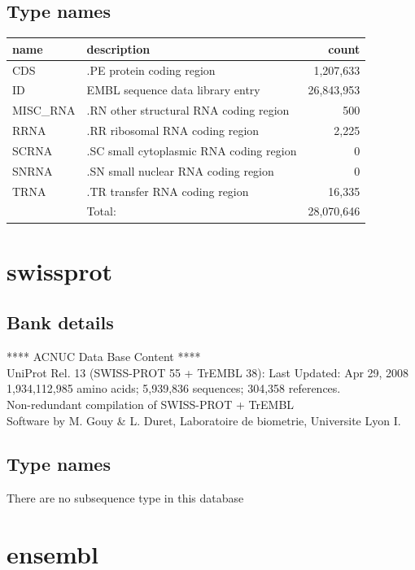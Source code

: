 \documentclass{article}
\begin{document}
\begin{Schunk}
\subsection{Type names}
\noindent\begin{tabular}{llr}
\hline \hline
name & description & count \\
\hline
CDS  &  .PE protein coding region  &  1,207,633 \\
ID  &  EMBL sequence data library entry  &  26,843,953 \\
MISC\_RNA  &  .RN other structural RNA coding region  &  500 \\
RRNA  &  .RR ribosomal RNA coding region  &  2,225 \\
SCRNA  &  .SC small cytoplasmic RNA coding region  &  0 \\
SNRNA  &  .SN small nuclear RNA coding region  &  0 \\
TRNA  &  .TR transfer RNA coding region  &  16,335 \\
\hline
 & Total: & 28,070,646 \\
\hline \hline
\end{tabular}

\section{ swissprot }
\subsection{Bank details}
               ****     ACNUC Data Base Content      ****                       \\
    UniProt Rel. 13 (SWISS-PROT 55 + TrEMBL 38): Last Updated: Apr 29, 2008\\
          1,934,112,985 amino acids; 5,939,836 sequences; 304,358 references.\\
          Non-redundant compilation of SWISS-PROT + TrEMBL\\
Software by M. Gouy \& L. Duret, Laboratoire de biometrie, Universite Lyon I.

\subsection{Type names}
There are no subsequence type in this database
\section{ ensembl }

\end{Schunk}
\end{document}
